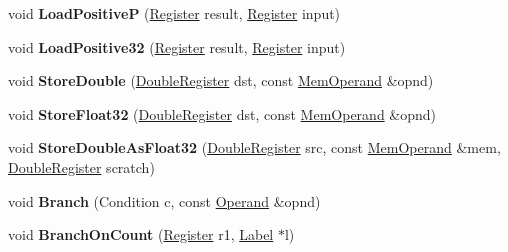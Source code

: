 \begin{DoxyCompactItemize}
void {\bfseries Load\+PositiveP} (\mbox{\hyperlink{classv8_1_1internal_1_1Register}{Register}} result, \mbox{\hyperlink{classv8_1_1internal_1_1Register}{Register}} input)
\item 
\mbox{\label{classv8_1_1internal_1_1TurboAssembler_af761a007343ad3381d0f0c0e58c60270}} 
void {\bfseries Load\+Positive32} (\mbox{\hyperlink{classv8_1_1internal_1_1Register}{Register}} result, \mbox{\hyperlink{classv8_1_1internal_1_1Register}{Register}} input)
\item 
\mbox{\label{classv8_1_1internal_1_1TurboAssembler_a868f8fadf2d8dbfd1fb6bc2472e7fc5c}} 
void {\bfseries Store\+Double} (\mbox{\hyperlink{classv8_1_1internal_1_1DoubleRegister}{Double\+Register}} dst, const \mbox{\hyperlink{classv8_1_1internal_1_1MemOperand}{Mem\+Operand}} \&opnd)
\item 
\mbox{\label{classv8_1_1internal_1_1TurboAssembler_a23652f388c9e47b4482173035daedd63}} 
void {\bfseries Store\+Float32} (\mbox{\hyperlink{classv8_1_1internal_1_1DoubleRegister}{Double\+Register}} dst, const \mbox{\hyperlink{classv8_1_1internal_1_1MemOperand}{Mem\+Operand}} \&opnd)
\item 
\mbox{\label{classv8_1_1internal_1_1TurboAssembler_a5bc6ff5ca798d678f90566caf90150d7}} 
void {\bfseries Store\+Double\+As\+Float32} (\mbox{\hyperlink{classv8_1_1internal_1_1DoubleRegister}{Double\+Register}} src, const \mbox{\hyperlink{classv8_1_1internal_1_1MemOperand}{Mem\+Operand}} \&mem, \mbox{\hyperlink{classv8_1_1internal_1_1DoubleRegister}{Double\+Register}} scratch)
\item 
\mbox{\label{classv8_1_1internal_1_1TurboAssembler_a340f6875b0213b74b29f1aa9264450ad}} 
void {\bfseries Branch} (Condition c, const \mbox{\hyperlink{classv8_1_1internal_1_1Operand}{Operand}} \&opnd)
\item 
\mbox{\label{classv8_1_1internal_1_1TurboAssembler_a60650adc5df6a5cc2c3dbcc05c6fc431}} 
void {\bfseries Branch\+On\+Count} (\mbox{\hyperlink{classv8_1_1internal_1_1Register}{Register}} r1, \mbox{\hyperlink{classv8_1_1internal_1_1Label}{Label}} $\ast$l)

\end{DoxyCompactItemize}
